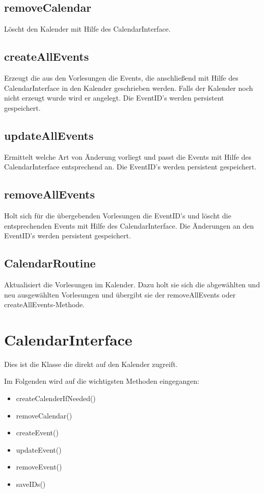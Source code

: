 \subsection{removeCalendar}
Löscht den Kalender mit Hilfe des CalendarInterface.

\subsection{createAllEvents}
Erzeugt die aus den Vorlesungen die Events, die anschließend mit Hilfe des CalendarInterface in den Kalender geschrieben werden.
Falls der Kalender noch nicht erzeugt wurde wird er angelegt.
Die EventID's werden persistent gespeichert.

\subsection{updateAllEvents}
Ermittelt welche Art von Änderung vorliegt und passt die Events mit Hilfe des CalendarInterface entsprechend an.
Die EventID's werden persistent gespeichert.

\subsection{removeAllEvents}
Holt sich für die übergebenden Vorlesungen die EventID's und löscht die entsprechenden Events mit Hilfe des CalendarInterface.
Die Änderungen an den EventID's werden persistent gespeichert.

\subsection{CalendarRoutine}
Aktualisiert die Vorlesungen im Kalender. Dazu holt sie sich die abgewählten und neu ausgewählten Vorlesungen und übergibt sie der removeAllEvents oder createAllEvents-Methode.

\section{CalendarInterface}
Dies ist die Klasse die direkt auf den Kalender zugreift. 

Im Folgenden wird auf die wichtigsten Methoden eingegangen:
\begin{itemize}
     \item createCalenderIfNeeded()
     \item removeCalendar()
     \item createEvent()
     \item updateEvent()
     \item removeEvent()
     \item saveIDs()
\end{itemize}


